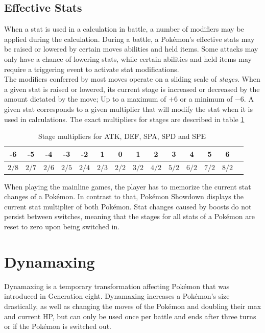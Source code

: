 \subsection{Effective Stats}
\label{sec:boosting}
When a stat is used in a calculation in battle, a number of modifiers may be applied during the calculation.
During a battle, a Pokémon's effective stats may be raised or lowered by certain moves abilities and 
held items. Some attacks may only have a chance of lowering stats, while certain abilities and held items
may require a triggering event to activate stat modifications. \\
The modifiers conferred by most moves operate on a sliding scale of \textit{stages}. When a given stat is raised
or lowered, its current stage is increased or decreased by the amount dictated by the move; Up to a maximum
of $+6$ or a minimum of $-6$. A given stat corresponds to a given multiplier that will modify the stat when it
is used in calculations. The exact multipliers for stages are described in table \ref{tab:boost-stage-multipliers}
\begin{table}[h]
	\centering
	\caption{Stage multipliers for \ac{ATK}, \ac{DEF}, \ac{SPA}, \ac{SPD} and \ac{SPE}~\autocite{Bulbapedia:Stat}}
	\begin{tabular}{|c|c|c|c|c|c|c|c|c|c|c|c|c|c|}
		\hline
		-6 & -5 & -4 & -3 & -2 & 1 & 0 & 1 & 2 & 3 & 4 & 5 & 6 \\
		\hline
		$2/8$ & $2/7$ & $2/6$ & $2/5$ & $2/4$ & $2/3$ & $2/2$ &  $3/2$ &  $4/2$ &  $5/2$ &  $6/2$ &  $7/2$ & $8/2$ \\
		\hline
	\end{tabular} 
	\label{tab:boost-stage-multipliers}
\end{table}
When playing the mainline games, the player has to memorize the current stat changes of a Pokémon. In contrast to that,
Pokémon Showdown displays the current stat multiplier of both Pokémon. Stat changes caused by boosts do not persist
between switches, meaning that the stages for all stats of a Pokémon are reset to zero upon being switched in.

\section{Dynamaxing}
\label{sec:dynamax}
Dynamaxing is a temporary transformation affecting Pokémon that was introduced in Generation eight. Dynamaxing increases
a Pokémon's size drastically, as well as changing the moves of the Pokémon and doubling their max and current \ac{HP},
but can only be used once per battle and ends after three turns or if the Pokémon is switched out.

